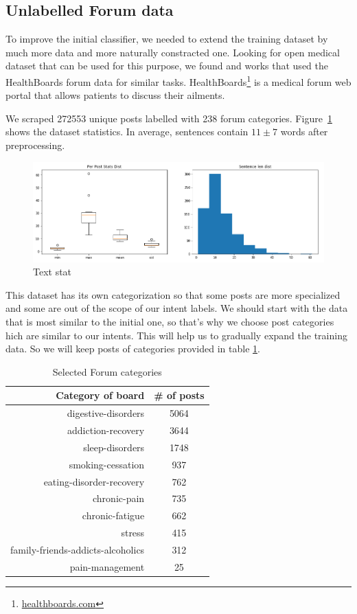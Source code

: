 \documentclass[11pt]{article}
\begin{document}
\subsection{Unlabelled Forum data}
\label{subsec:forumdata}

To improve the initial classifier, we needed to extend the training
dataset by much more data and more naturally constracted one. Looking
for open medical dataset that can be used for this purpose, we found
\cite{zhang2015} and \cite{sondhi-EtAl:2010:POSTERS} works that used
the HealthBoards forum data for similar tasks. 
HealthBoards\footnote{\url{healthboards.com}} is a medical forum web portal that
allows patients to discuss their ailments.


We scraped 272553 unique posts labelled with 238 forum
categories. Figure~\ref{forum_data_stat} shows the dataset
statistics. In average, sentences contain $11\pm7$ words after
preprocessing.


 \begin{figure}[h]
 	\centering
 	\includegraphics[scale=0.4]{report3.png}
	\caption{Text stat}\label{forum_data_stat}
 \end{figure}
\FloatBarrier

This dataset has its own categorization so that some posts are more specialized and some are out of the scope of our intent labels. We should start with the data that is most similar to the initial one, so that's why we choose post categories hich are similar to our intents. This will help us to gradually expand the training data. So we will keep posts of categories provided in table \ref{cat_freq}.

\begin{table}[htb]
\centering
\begin{tabular}{ |r|c| }
\hline
Category of board &  \# of posts \\ \hline
digestive-disorders & 5064 \\ \hline
addiction-recovery & 3644 \\ \hline
sleep-disorders & 1748 \\ \hline
smoking-cessation & 937 \\ \hline
eating-disorder-recovery & 762 \\ \hline
chronic-pain & 735 \\ \hline
chronic-fatigue & 662 \\ \hline
stress & 415 \\ \hline
family-friends-addicts-alcoholics & 312 \\ \hline
pain-management & 25 \\ \hline
\end{tabular}
\caption{Selected Forum categories}\label{cat_freq}
\end{table}
\FloatBarrier
\end{document}
